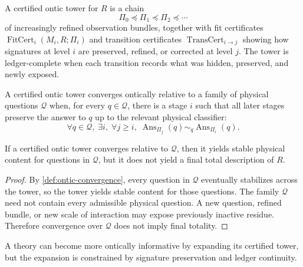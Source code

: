 \begin{definition}
\label{def:certified-ontic-tower}
A certified ontic tower for $R$ is a chain
$$
\Pi_0\preceq\Pi_1\preceq\Pi_2\preceq\cdots
$$
of increasingly refined observation bundles, together with fit certificates $\operatorname{FitCert}_i(M_i,R;\Pi_i)$ and transition certificates $\operatorname{TransCert}_{i\to j}$ showing how signatures at level $i$ are preserved, refined, or corrected at level $j$. The tower is ledger-complete when each transition records what was hidden, preserved, and newly exposed.
\end{definition}


\begin{definition}
\label{def:ontic-convergence}
A certified ontic tower converges ontically relative to a family of physical questions $\mathcal Q$ when, for every $q\in\mathcal Q$, there is a stage $i$ such that all later stages preserve the answer to $q$ up to the relevant physical classifier:
$$
\forall q\in\mathcal Q,\;
\exists i,\;
\forall j\geq i,\;
\operatorname{Ans}_{\Pi_j}(q)
\sim_q
\operatorname{Ans}_{\Pi_i}(q).
$$
\end{definition}

\begin{theorem}
\label{thm:ontic-convergence-stable-not-total}
If a certified ontic tower converges relative to $\mathcal Q$, then it yields stable physical content for questions in $\mathcal Q$, but it does not yield a final total description of $R$.
\end{theorem}

\begin{proof}
By \autoref{def:ontic-convergence}, every question in $\mathcal Q$ eventually stabilizes across the tower, so the tower yields stable content for those questions. The family $\mathcal Q$ need not contain every admissible physical question. A new question, refined bundle, or new scale of interaction may expose previously inactive residue. Therefore convergence over $\mathcal Q$ does not imply final totality.
\end{proof}

\begin{corollary}
\label{cor:ontic-knowledge-expandable-constrained}
A theory can become more ontically informative by expanding its certified tower, but the expansion is constrained by signature preservation and ledger continuity.
\end{corollary}

